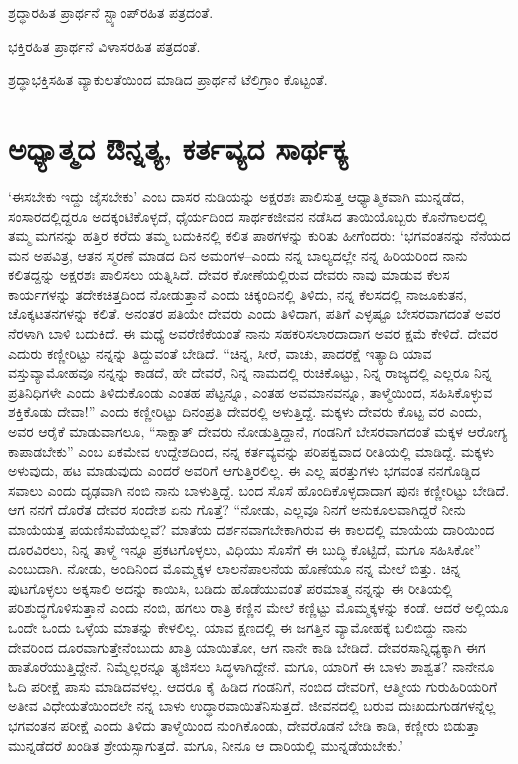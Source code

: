 ಶ್ರದ್ಧಾರಹಿತ ಪ್ರಾರ್ಥನೆ ಸ್ಟ್ಯಾಂಪ್​ರಹಿತ ಪತ್ರದಂತೆ.

ಭಕ್ತಿರಹಿತ ಪ್ರಾರ್ಥನೆ ವಿಳಾಸರಹಿತ ಪತ್ರದಂತೆ.

ಶ್ರದ್ಧಾಭಕ್ತಿಸಹಿತ ವ್ಯಾಕುಲತೆಯಿಂದ ಮಾಡಿದ ಪ್ರಾರ್ಥನೆ ಟೆಲಿಗ್ರಾಂ ಕೊಟ್ಟಂತೆ.


\section*{ಅಧ್ಯಾತ್ಮದ ಔನ್ನತ್ಯ, ಕರ್ತವ್ಯದ ಸಾರ್ಥಕ್ಯ}

\vskip -6.2pt

‘ಈಸಬೇಕು ಇದ್ದು ಜೈಸಬೇಕು’ ಎಂಬ ದಾಸರ ನುಡಿಯನ್ನು ಅಕ್ಷರಶಃ ಪಾಲಿಸುತ್ತ ಆಧ್ಯಾತ್ಮಿಕವಾಗಿ ಮುನ್ನಡೆದ, ಸಂಸಾರದಲ್ಲಿದ್ದರೂ ಅದಕ್ಕಂಟಿಕೊಳ್ಳದೆ, ಧೈರ್ಯದಿಂದ ಸಾರ್ಥಕಜೀವನ ನಡೆಸಿದ ತಾಯಿಯೊಬ್ಬರು ಕೊನೆಗಾಲದಲ್ಲಿ ತಮ್ಮ ಮಗನನ್ನು ಹತ್ತಿರ ಕರೆದು ತಮ್ಮ ಬದುಕಿನಲ್ಲಿ ಕಲಿತ ಪಾಠಗಳನ್ನು ಕುರಿತು ಹೀಗೆಂದರು: ‘ಭಗವಂತನನ್ನು ನೆನೆಯದ ಮನ ಅಪವಿತ್ರ, ಆತನ ಸ್ಮರಣೆ ಮಾಡದ ದಿನ ಅಮಂಗಳ–ಎಂದು ನನ್ನ ಬಾಲ್ಯದಲ್ಲೇ ನನ್ನ ಹಿರಿಯರಿಂದ ನಾನು ಕಲಿತದ್ದನ್ನು ಅಕ್ಷರಶಃ ಪಾಲಿಸಲು ಯತ್ನಿಸಿದೆ. ದೇವರ ಕೋಣೆಯಲ್ಲಿರುವ ದೇವರು ನಾವು ಮಾಡುವ ಕೆಲಸ ಕಾರ್ಯಗಳನ್ನು ತದೇಕಚಿತ್ತದಿಂದ ನೋಡುತ್ತಾನೆ ಎಂದು ಚಿಕ್ಕಂದಿನಲ್ಲಿ ತಿಳಿದು, ನನ್ನ ಕೆಲಸದಲ್ಲಿ ನಾಜೂಕುತನ, ಚೊಕ್ಕಟತನಗಳನ್ನು ಕಲಿತೆ. ಅನಂತರ ಪತಿಯೇ ದೇವರು ಎಂದು ತಿಳಿದಾಗ, ಪತಿಗೆ ಎಳ್ಳಷ್ಟೂ ಬೇಸರವಾಗದಂತೆ ಅವರ ನೆರಳಾಗಿ ಬಾಳಿ ಬದುಕಿದೆ. ಈ ಮಧ್ಯೆ ಅವರೆಣಿಕೆಯಂತೆ ನಾನು ಸಹಕರಿಸಲಾರದಾದಾಗ ಅವರ ಕ್ಷಮೆ ಕೇಳಿದೆ. ದೇವರ ಎದುರು ಕಣ್ಣೀರಿಟ್ಟು ನನ್ನನ್ನು ತಿದ್ದುವಂತೆ ಬೇಡಿದೆ. “ಚಿನ್ನ, ಸೀರೆ, ವಾಚು, ಪಾದರಕ್ಷೆ ಇತ್ಯಾದಿ ಯಾವ ವಸ್ತುವ್ಯಾಮೋಹವೂ ನನ್ನನ್ನು ಕಾಡದೆ, ಹೇ ದೇವರೆ, ನಿನ್ನ ನಾಮದಲ್ಲಿ ರುಚಿಕೊಟ್ಟು, ನಿನ್ನ ರಾಜ್ಯದಲ್ಲಿ ಎಲ್ಲರೂ ನಿನ್ನ ಪ್ರತಿನಿಧಿಗಳೇ ಎಂದು ತಿಳಿದುಕೊಂಡು ಎಂತಹ ಪೆಟ್ಟನ್ನೂ, ಎಂತಹ ಅವಮಾನವನ್ನೂ, ತಾಳ್ಮೆಯಿಂದ, ಸಹಿಸಿಕೊಳ್ಳುವ ಶಕ್ತಿಕೊಡು ದೇವಾ!” ಎಂದು ಕಣ್ಣೀರಿಟ್ಟು ದಿನಂಪ್ರತಿ ದೇವರಲ್ಲಿ ಅಳುತ್ತಿದ್ದೆ. ಮಕ್ಕಳು ದೇವರು ಕೊಟ್ಟ ವರ ಎಂದು, ಅವರ ಆರೈಕೆ ಮಾಡುವಾಗಲೂ, “ಸಾಕ್ಷಾತ್ ದೇವರು ನೋಡುತ್ತಿದ್ದಾನೆ, ಗಂಡನಿಗೆ ಬೇಸರವಾಗದಂತೆ ಮಕ್ಕಳ ಆರೋಗ್ಯ ಕಾಪಾಡಬೇಕು” ಎಂಬ ಏಕಮೇವ ಉದ್ದೇಶದಿಂದ, ನನ್ನ ಕರ್ತವ್ಯವನ್ನು ಪರಿಪಕ್ವವಾದ ರೀತಿಯಲ್ಲಿ ಮಾಡಿದ್ದೆ. ಮಕ್ಕಳು ಅಳುವುದು, ಹಟ ಮಾಡುವುದು ಎಂದರೆ ಅವರಿಗೆ ಆಗುತ್ತಿರಲಿಲ್ಲ. ಈ ಎಲ್ಲ ಷರತ್ತುಗಳು ಭಗವಂತ ನನಗೊಡ್ಡಿದ ಸವಾಲು ಎಂದು ದೃಢವಾಗಿ ನಂಬಿ ನಾನು ಬಾಳುತ್ತಿದ್ದೆ. ಬಂದ ಸೊಸೆ ಹೊಂದಿಕೊಳ್ಳದಾದಾಗ ಪುನಃ ಕಣ್ಣೀರಿಟ್ಟು ಬೇಡಿದೆ. ಆಗ ನನಗೆ ದೊರೆತ ದೇವರ ಸಂದೇಶ ಏನು ಗೊತ್ತೆ? “ನೋಡು, ಎಲ್ಲವೂ ನಿನಗೆ ಅನುಕೂಲವಾಗಿದ್ದರೆ ನೀನು ಮಾಯೆಯತ್ತ ಪಯಣಿಸುವೆಯಲ್ಲವೆ? ಮಾತೆಯ ದರ್ಶನವಾಗಬೇಕಾಗಿರುವ ಈ ಕಾಲದಲ್ಲಿ ಮಾಯೆಯ ದಾರಿಯಿಂದ ದೂರವಿರಲು, ನಿನ್ನ ತಾಳ್ಮೆ ಇನ್ನೂ ಪ್ರಕಟಗೊಳ್ಳಲು, ವಿಧಿಯು ಸೊಸೆಗೆ ಈ ಬುದ್ಧಿ ಕೊಟ್ಟಿದೆ, ಮಗೂ ಸಹಿಸಿಕೋ” ಎಂಬುದಾಗಿ. ನೋಡು, ಅಂದಿನಿಂದ ಮೊಮ್ಮಕ್ಕಳ ಲಾಲನೆಪಾಲನೆಯ ಹೊಣೆಯೂ ನನ್ನ ಮೇಲೆ ಬಿತ್ತು. ಚಿನ್ನ ಪುಟಗೊಳ್ಳಲು ಅಕ್ಕಸಾಲಿ ಅದನ್ನು ಕಾಯಿಸಿ, ಬಡಿದು ಹೊಡೆಯುವಂತೆ ಪರಮಾತ್ಮ ನನ್ನನ್ನು ಈ ರೀತಿಯಲ್ಲಿ ಪರಿಶುದ್ಧಗೊಳಿಸುತ್ತಾನೆ ಎಂದು ನಂಬಿ, ಹಗಲು ರಾತ್ರಿ ಕಣ್ಣಿನ ಮೇಲೆ ಕಣ್ಣಿಟ್ಟು ಮೊಮ್ಮಕ್ಕಳನ್ನು ಕಂಡೆ. ಆದರೆ ಅಲ್ಲಿಯೂ ಒಂದೇ ಒಂದು ಒಳ್ಳೆಯ ಮಾತನ್ನು ಕೇಳಲಿಲ್ಲ. ಯಾವ ಕ್ಷಣದಲ್ಲಿ ಈ ಜಗತ್ತಿನ ವ್ಯಾಮೋಹಕ್ಕೆ ಬಲಿಬಿದ್ದು ನಾನು ದೇವರಿಂದ ದೂರವಾಗುತ್ತೇನೆಂಬುದು ಖಾತ್ರಿ ಯಾಯಿತೋ, ಆಗ ನಾನೇ ಕಾಡಿ ಬೇಡಿದೆ. ದೇವರ\break ಸಾನ್ನಿಧ್ಯಕ್ಕಾಗಿ ಈಗ ಹಾತೊರೆಯುತ್ತಿದ್ದೇನೆ. ನಿಮ್ಮೆಲ್ಲರನ್ನೂ ತ್ಯಜಿಸಲು ಸಿದ್ಧಳಾಗಿದ್ದೇನೆ. ಮಗೂ, ಯಾರಿಗೆ ಈ ಬಾಳು ಶಾಶ್ವತ? ನಾನೇನೂ ಓದಿ ಪರೀಕ್ಷೆ ಪಾಸು ಮಾಡಿದವಳಲ್ಲ. ಆದರೂ ಕೈ ಹಿಡಿದ ಗಂಡನಿಗೆ, ನಂಬಿದ ದೇವರಿಗೆ, ಆತ್ಮೀಯ ಗುರುಹಿರಿಯರಿಗೆ ಅತೀವ ವಿಧೇಯತೆಯಿಂದಲೇ ನನ್ನ ಬಾಳು ಉದ್ಧಾರವಾಯಿತೆನಿಸುತ್ತದೆ. ಜೀವನದಲ್ಲಿ ಬರುವ ದುಃಖದುಗುಡಗಳನ್ನೆಲ್ಲ ಭಗವಂತನ ಪರೀಕ್ಷೆ ಎಂದು ತಿಳಿದು ತಾಳ್ಮೆಯಿಂದ ನುಂಗಿಕೊಂಡು, ದೇವರೊಡನೆ ಬೇಡಿ ಕಾಡಿ, ಕಣ್ಣೀರು ಬಿಡುತ್ತಾ ಮುನ್ನಡೆದರೆ ಖಂಡಿತ ಶ್ರೇಯಸ್ಸಾಗುತ್ತದೆ. ಮಗೂ, ನೀನೂ ಆ ದಾರಿಯಲ್ಲಿ ಮುನ್ನಡೆಯಬೇಕು.’

